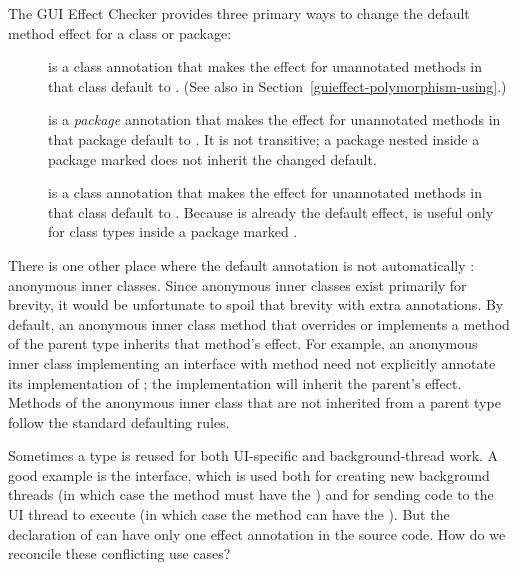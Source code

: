 The GUI Effect Checker provides three primary ways to change the default method effect for a class
or package:
\begin{description}
\item[]
  is a class annotation that makes the effect for unannotated methods in
  that class default to .  (See also  in
  Section~\ref{guieffect-polymorphism-using}.)
\item[]
  is a \emph{package} annotation that makes the effect for unannotated
  methods in that package default to .  It is not
  transitive; a package nested inside a package marked 
  does not inherit the changed default.
\item[]
  is a class annotation that makes the effect for unannotated methods in
  that class default to .  Because  is
  already the default effect,  is useful only for class
  types inside a package marked .
\end{description}

There is one other place where the default annotation is not automatically :
anonymous inner classes.  Since anonymous inner classes exist primarily for brevity, it would be
unfortunate to spoil that brevity with extra annotations.  By default, an anonymous inner class
method that overrides or implements a method of the parent type inherits that method's effect.
For example, an anonymous inner class implementing an interface with method  need not explicitly annotate its implementation of ; the implementation will inherit
the parent's effect.  Methods of the anonymous inner class that are not inherited from a parent type
follow the standard defaulting rules.



Sometimes a type is reused for both UI-specific and background-thread work.  A good example is the
 interface, which is used both for creating new background threads (in which case the
 method must have the ) and for sending code to the UI thread to
execute (in which case the  method can have the
).  But the declaration of
 can have only one effect annotation in the source code.
How do we reconcile these
conflicting use cases?

